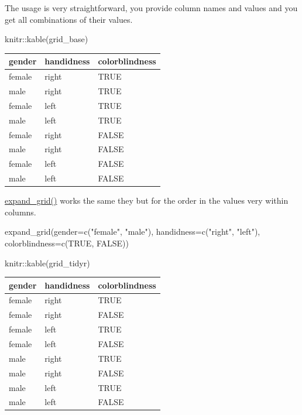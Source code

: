 \documentclass[
]{book}
\newenvironment{Shaded}{\begin{snugshade}}{\end{snugshade}}
\newcommand{\AttributeTok}[1]{\textcolor[rgb]{0.77,0.63,0.00}{#1}}
\newcommand{\ConstantTok}[1]{\textcolor[rgb]{0.00,0.00,0.00}{#1}}
\newcommand{\FunctionTok}[1]{\textcolor[rgb]{0.00,0.00,0.00}{#1}}
\newcommand{\NormalTok}[1]{#1}
\newcommand{\SpecialCharTok}[1]{\textcolor[rgb]{0.00,0.00,0.00}{#1}}
\newcommand{\StringTok}[1]{\textcolor[rgb]{0.31,0.60,0.02}{#1}}
\begin{document}
The usage is very straightforward, you provide column names and values and you get all combinations of their values.

\begin{Shaded}
\begin{Highlighting}[]
\NormalTok{knitr}\SpecialCharTok{::}\FunctionTok{kable}\NormalTok{(grid\_base)}
\end{Highlighting}
\end{Shaded}

\begin{tabular}{l|l|l}
\hline
gender & handidness & colorblindness\\
\hline
female & right & TRUE\\
\hline
male & right & TRUE\\
\hline
female & left & TRUE\\
\hline
male & left & TRUE\\
\hline
female & right & FALSE\\
\hline
male & right & FALSE\\
\hline
female & left & FALSE\\
\hline
male & left & FALSE\\
\hline
\end{tabular}

\href{https://tidyr.tidyverse.org/reference/expand_grid.html}{expand\_grid()} works the same they but for the order in the values very within columns.

\begin{Shaded}
\begin{Highlighting}[]
\FunctionTok{expand\_grid}\NormalTok{(}\AttributeTok{gender=}\FunctionTok{c}\NormalTok{(}\StringTok{"female"}\NormalTok{, }\StringTok{"male"}\NormalTok{), }
            \AttributeTok{handidness=}\FunctionTok{c}\NormalTok{(}\StringTok{"right"}\NormalTok{, }\StringTok{"left"}\NormalTok{),}
            \AttributeTok{colorblindness=}\FunctionTok{c}\NormalTok{(}\ConstantTok{TRUE}\NormalTok{, }\ConstantTok{FALSE}\NormalTok{))}
\end{Highlighting}
\end{Shaded}

\begin{Shaded}
\begin{Highlighting}[]
\NormalTok{knitr}\SpecialCharTok{::}\FunctionTok{kable}\NormalTok{(grid\_tidyr)}
\end{Highlighting}
\end{Shaded}

\begin{tabular}{l|l|l}
\hline
gender & handidness & colorblindness\\
\hline
female & right & TRUE\\
\hline
female & right & FALSE\\
\hline
female & left & TRUE\\
\hline
female & left & FALSE\\
\hline
male & right & TRUE\\
\hline
male & right & FALSE\\
\hline
male & left & TRUE\\
\hline
male & left & FALSE\\
\hline
\end{tabular}
\end{document}

